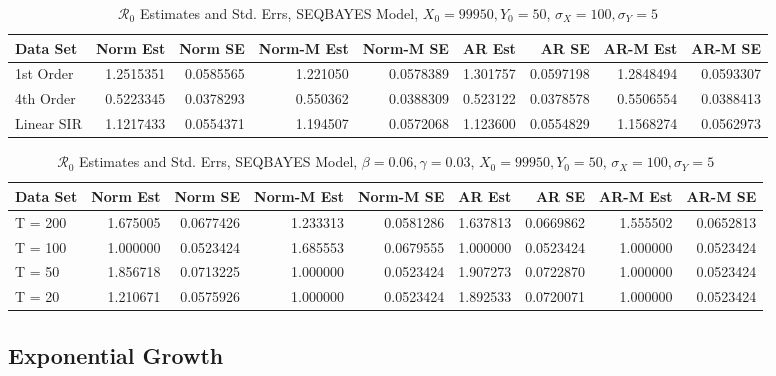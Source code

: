 \message{ !name(draft_v13.tex)}\documentclass[12pt]{article}
\newcommand{\rr}{\ensuremath{\mathcal{R}_0}}
\begin{document}
\begin{table}[H]
	
	\caption{\label{tab:}$\rr$ Estimates and Std. Errs, SEQBAYES Model,
		$X_0 = 99950, Y_0 = 50$, $\sigma_X = 100, \sigma_Y = 5$}
	\centering
	\begin{footnotesize}
	\begin{tabular}[t]{l|r|r|r|r|r|r|r|r}
		\hline
		Data Set & Norm Est & Norm SE & Norm-M Est & Norm-M SE & AR Est & AR SE & AR-M Est & AR-M SE\\
		\hline
		1st Order & 1.2515351 & 0.0585565 & 1.221050 & 0.0578389 & 1.301757 & 0.0597198 & 1.2848494 & 0.0593307\\
		\hline
		4th Order & 0.5223345 & 0.0378293 & 0.550362 & 0.0388309 & 0.523122 & 0.0378578 & 0.5506554 & 0.0388413\\
		\hline
		Linear SIR & 1.1217433 & 0.0554371 & 1.194507 & 0.0572068 & 1.123600 & 0.0554829 & 1.1568274 & 0.0562973\\
		\hline
	\end{tabular}
	\end{footnotesize}
\end{table}

\begin{table}[H]
	
	\caption{\label{tab:}$\rr$ Estimates and Std. Errs, SEQBAYES Model,
		$\beta = 0.06, \gamma = 0.03$, $X_0 = 99950, Y_0 = 50$, $\sigma_X = 100, \sigma_Y = 5$}
	\centering
	\begin{tabular}[t]{l|r|r|r|r|r|r|r|r}
		\hline
		Data Set & Norm Est & Norm SE & Norm-M Est & Norm-M SE & AR Est & AR SE & AR-M Est & AR-M SE\\
		\hline
		T = 200 & 1.675005 & 0.0677426 & 1.233313 & 0.0581286 & 1.637813 & 0.0669862 & 1.555502 & 0.0652813\\
		\hline
		T = 100 & 1.000000 & 0.0523424 & 1.685553 & 0.0679555 & 1.000000 & 0.0523424 & 1.000000 & 0.0523424\\
		\hline
		T = 50 & 1.856718 & 0.0713225 & 1.000000 & 0.0523424 & 1.907273 & 0.0722870 & 1.000000 & 0.0523424\\
		\hline
		T = 20 & 1.210671 & 0.0575926 & 1.000000 & 0.0523424 & 1.892533 & 0.0720071 & 1.000000 & 0.0523424\\
		\hline
	\end{tabular}
\end{table}

\subsection{Exponential Growth}
\end{document}
